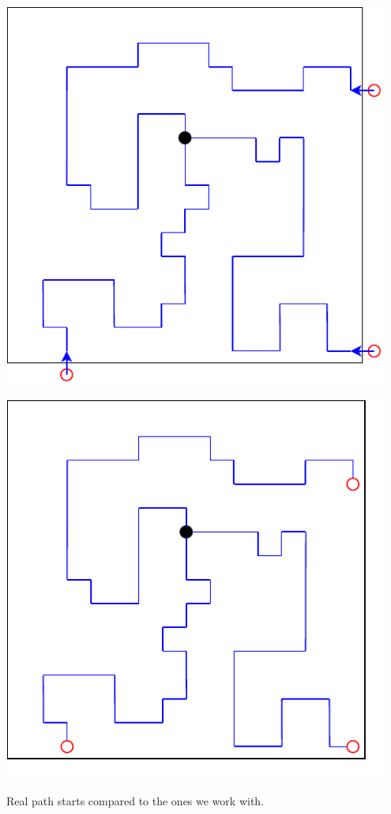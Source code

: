 \begin{center}
    \captionsetup{type=figure}
    \begin{minipage}{.5\textwidth}
        \centering
        \includegraphics[width=0.95\textwidth]{img/path starts real.pdf}
    \end{minipage}%
    \begin{minipage}{.5\textwidth}
        \centering
        \includegraphics[width=0.95\textwidth]{img/path starts theory.pdf}
    \end{minipage}
    \caption{Real path starts compared to the ones we work with.}
    \label{fig:real-path-starts}
\end{center}

